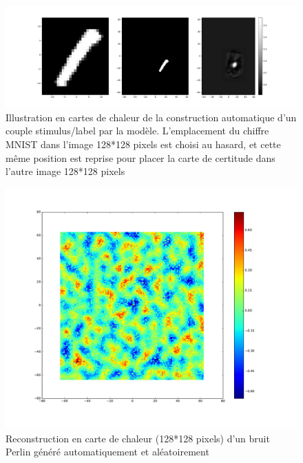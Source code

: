 \begin{figure}[th]
\centering
\includegraphics[scale=0.4]{Figures/couples_a-v}
\decoRule
\caption[Figure]{Illustration en cartes de chaleur de la construction automatique d'un couple stimulus/label par la modèle. L'emplacement du chiffre MNIST dans l'image 128*128 pixels est choisi au hasard, et cette même position est reprise pour placer la carte de certitude dans l'autre image 128*128 pixels}
\label{fig:couples}
\end{figure}

\begin{figure}[th]
\centering
\includegraphics[scale=0.4]{Figures/perlin_noise}
\decoRule
\caption[Figure]{Reconstruction en carte de chaleur (128*128 pixels) d'un bruit Perlin généré automatiquement et aléatoirement \autocite{Perlin1985}}
\label{fig:perlin_noise}
\end{figure}


